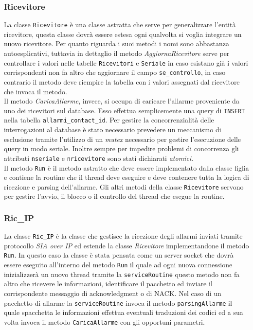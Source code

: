 \subsubsection{Ricevitore}
La classe \texttt{Ricevitore} è una classe astratta che serve per generalizzare l'entità ricevitore, questa classe dovrà essere estesa ogni qualvolta si voglia integrare un nuovo ricevitore. Per quanto riguarda i suoi metodi i nomi sono abbastanza autoesplicativi, tuttavia in dettaglio il metodo \emph{AggiornaRicevitore} serve per controllare i valori nelle tabelle \texttt{Ricevitori} e \texttt{Seriale} in caso esistano già i valori corrispondenti non fa altro che aggiornare il campo \texttt{se\_controllo}, in caso contrario il metodo deve riempire la tabella con i valori assegnati dal ricevitore che invoca il metodo.\\
Il metodo \emph{CaricaAllarme}, invece, si occupa di caricare l'allarme proveniente da uno dei ricevitori sul database. Esso effettua semplicemente una query di \texttt{INSERT} nella tabella \texttt{allarmi\_contact\_id}. Per gestire la concorrenzialità delle interrogazioni al database è stato necessario prevedere un meccanismo di esclusione tramite l'utilizzo di un \emph{mutex} necessario per gestire l'esecuzione delle query in modo seriale. Inoltre sempre per impedire problemi di concorrenza gli attributi \texttt{nseriale} e \texttt{nricevitore} sono stati dichiarati \emph{atomici}.\\
Il metodo \texttt{Run} è il metodo astratto che deve essere implementato dalla classe figlia e contiene la routine che il thread deve eseguire e deve contenere tutta la logica di ricezione e parsing dell'allarme. Gli altri metodi della classe \texttt{Ricevitore} servono per gestire l'avvio, il blocco o il controllo del thread che esegue la routine.\\
\subsubsection{Ric\_IP}
La classe \texttt{Ric\_IP} è la classe che gestisce la ricezione degli allarmi inviati tramite protocollo \emph{SIA over IP} ed estende la classe \emph{Ricevitore} implementandone il metodo \texttt{Run}. In questo caso la classe è stata pensata come un server socket che dovrà essere eseguito all'interno del metodo \texttt{Run} il quale ad ogni nuova connessione inizializzerà un nuovo  thread tramite la \texttt{serviceRoutine} questo metodo non fa altro che ricevere le informazioni, identificare il pacchetto ed inviare il corrispondente messaggio di acknowledgment o di NACK. Nel caso di un pacchetto di allarme la \texttt{serviceRoutine} invoca il metodo \texttt{parsingAllarme} il quale spacchetta le informazioni effettua eventuali traduzioni dei codici ed a sua volta invoca il metodo \texttt{CaricaAllarme} con gli opportuni parametri.
